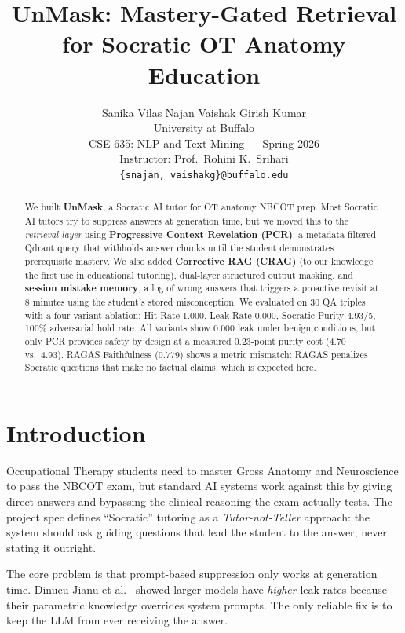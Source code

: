 \documentclass[11pt]{article}
\title{UnMask: Mastery-Gated Retrieval for Socratic OT Anatomy Education}
\author{Sanika Vilas Najan \quad Vaishak Girish Kumar \\
  University at Buffalo \\
  CSE 635: NLP and Text Mining --- Spring 2026 \\
  Instructor: Prof.\ Rohini K.\ Srihari \\
  \texttt{\{snajan, vaishakg\}@buffalo.edu}}
\begin{document}
\maketitle

\begin{abstract}
We built \textbf{UnMask}, a Socratic AI tutor for OT anatomy NBCOT prep.
Most Socratic AI tutors try to suppress answers at generation time, but
we moved this to the \emph{retrieval layer} using \textbf{Progressive Context Revelation (PCR)}:
a metadata-filtered Qdrant query that withholds answer chunks until
the student demonstrates prerequisite mastery.
We also added \textbf{Corrective RAG (CRAG)} (to our knowledge the first use in
educational tutoring), dual-layer structured output masking, and
\textbf{session mistake memory}, a log of wrong answers that triggers a
proactive revisit at 8 minutes using the student's stored misconception.
We evaluated on 30 QA triples with a four-variant ablation: Hit Rate 1.000,
Leak Rate 0.000, Socratic Purity 4.93/5, 100\% adversarial hold rate.
All variants show 0.000 leak under benign conditions, but only PCR
provides safety by design at a measured 0.23-point purity cost (4.70 vs.\ 4.93).
RAGAS Faithfulness (0.779) shows a metric mismatch: RAGAS penalizes
Socratic questions that make no factual claims, which is expected here.
\end{abstract}

\section{Introduction}

Occupational Therapy students need to master Gross Anatomy and Neuroscience to
pass the NBCOT exam, but standard AI systems work against this by giving direct answers
and bypassing the clinical reasoning the exam actually tests.
The project spec defines ``Socratic'' tutoring as a \emph{Tutor-not-Teller}
approach: the system should ask guiding questions that lead the student to the answer,
never stating it outright.

The core problem is that prompt-based suppression only works at generation time.
Dinucu-Jianu et al.\ \cite{tutorrl2025} showed larger models have \emph{higher}
leak rates because their parametric knowledge overrides system prompts.
The only reliable fix is to keep the LLM from ever receiving the answer.
\end{document}
